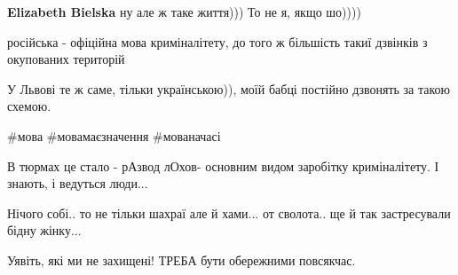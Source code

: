 \begin{itemize}
\begin{itemize}
\textbf{Elizabeth Bielska} ну але ж таке життя)))
То не я, якщо шо))))
\end{itemize}

 
російська - офіційна мова криміналітету, до того ж більшість такиї дзвінків з окупованих територій

 
У Львові те ж саме, тільки українською)), моїй бабці постійно дзвонять за такою схемою.

 
\#мова \#мовамаєзначення \#мованачасі

 
В тюрмах це стало - рАзвод лОхов- основним видом заробітку криміналітету. І знають, і ведуться люди...

 
Нічого собі.. то не тільки шахраї але й хами... от сволота.. ще й так застресували бідну жінку...

 
Уявіть, які ми не захищені! ТРЕБА бути обережними повсякчас.

\end{itemize}

